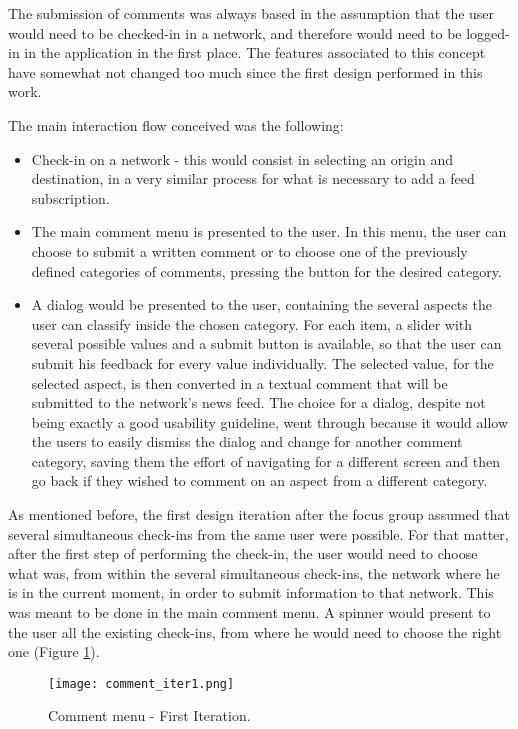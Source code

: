 The submission of comments was always based in the assumption that the user would need to be checked-in in a network, and therefore would need to be logged-in in the application in the first place. 
The features associated to this concept have somewhat not changed too much since the first design performed in this work.

The main interaction flow conceived was the following:

\begin{itemize}
\item Check-in on a network - this would consist in selecting an origin and destination, in a very similar process for what is necessary to add a feed subscription.
\item The main comment menu is presented to the user. In this menu, the user can choose to submit a written comment or to choose one of the previously defined categories of comments, pressing the button for the desired category.
\item A dialog would be presented to the user, containing the several aspects the user can classify inside the chosen category. For each item, a slider with several possible values and a submit button is available, so that the user can submit his feedback for every value individually. The selected value, for the selected aspect, is then converted in a textual comment that will be submitted to the network's news feed. The choice for a dialog, despite not being exactly a good usability guideline, went through because it would allow the users to easily dismiss the dialog and change for another comment category, saving them the effort of navigating for a different screen and then go back if they wished to comment on an aspect from a different category.
\end{itemize}


As mentioned before, the first design iteration after the focus group assumed that several simultaneous check-ins from the same user were possible. For that matter, after the first step of performing the check-in, the user would need to choose what was, from within the several simultaneous check-ins, the network where he is in the current moment, in order to submit information to that network.
This was meant to be done in the main comment menu. A spinner would present to the user all the existing check-ins, from where he would need to choose the right one (Figure \ref{fig:comment_iter1}).

\begin{figure}[h!]
  \begin{center}
    \leavevmode
    \texttt{[image: comment\_iter1.png]}
    \caption{Comment menu - First Iteration.}
    \label{fig:comment_iter1}
  \end{center}
\end{figure}

